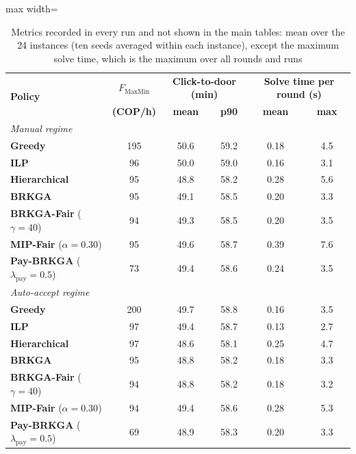 \documentclass[a4paper,11pt,review,3p,authoryear]{elsarticle}
\newcommand{\FM}{F_{\text{MaxMin}}}
\begin{document}
\begin{table}[htbp]
\centering
\small
\begin{adjustbox}{max width=\textwidth}
\begin{tabular}{l|c|cc|cc}
\hline
\multirow{2}{*}{\textbf{Policy}} & $\FM$ & \multicolumn{2}{c|}{\textbf{Click-to-door (min)}} & \multicolumn{2}{c}{\textbf{Solve time per round (s)}} \\
 & \textbf{(COP/h)} & \textbf{mean} & \textbf{p90} & \textbf{mean} & \textbf{max} \\
\hline
\multicolumn{6}{l}{\textit{Manual regime}} \\
\textbf{Greedy} & 195 & 50.6 & 59.2 & 0.18 & 4.5 \\
\textbf{ILP} & 96 & 50.0 & 59.0 & 0.16 & 3.1 \\
\textbf{Hierarchical} & 95 & 48.8 & 58.2 & 0.28 & 5.6 \\
\textbf{BRKGA} & 95 & 49.1 & 58.5 & 0.20 & 3.3 \\
\textbf{BRKGA-Fair} ($\gamma = 40$) & 94 & 49.3 & 58.5 & 0.20 & 3.5 \\
\textbf{MIP-Fair} ($\alpha = 0.30$) & 95 & 49.6 & 58.7 & 0.39 & 7.6 \\
\textbf{Pay-BRKGA} ($\lambda_{\text{pay}} = 0.5$) & 73 & 49.4 & 58.6 & 0.24 & 3.5 \\
\hline
\multicolumn{6}{l}{\textit{Auto-accept regime}} \\
\textbf{Greedy} & 200 & 49.7 & 58.8 & 0.16 & 3.5 \\
\textbf{ILP} & 97 & 49.4 & 58.7 & 0.13 & 2.7 \\
\textbf{Hierarchical} & 97 & 48.6 & 58.1 & 0.25 & 4.7 \\
\textbf{BRKGA} & 95 & 48.8 & 58.2 & 0.18 & 3.3 \\
\textbf{BRKGA-Fair} ($\gamma = 40$) & 94 & 48.8 & 58.2 & 0.18 & 3.2 \\
\textbf{MIP-Fair} ($\alpha = 0.30$) & 94 & 49.4 & 58.6 & 0.28 & 5.3 \\
\textbf{Pay-BRKGA} ($\lambda_{\text{pay}} = 0.5$) & 69 & 48.9 & 58.3 & 0.20 & 3.3 \\
\hline
\end{tabular}
\end{adjustbox}
\caption{Metrics recorded in every run and not shown in the main tables: mean over the 24 instances (ten seeds averaged within each instance), except the maximum solve time, which is the maximum over all rounds and runs}
\label{tab:metrics}
\end{table}
\end{document}
